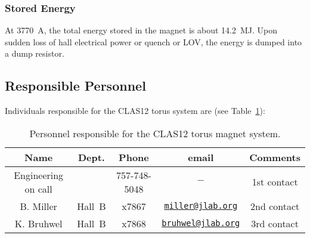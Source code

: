 \subsubsection{Stored Energy}

At 3770~A, the total energy stored in the magnet is about 14.2~MJ. Upon sudden loss of hall 
electrical power or quench or LOV, the energy is dumped into a dump resistor.

\subsection{Responsible Personnel}

Individuals responsible for the CLAS12 torus system are (see Table~\ref{tb:torus}):

\begin{table}[!htb]
\centering
\begin{tabular}{|c|c|c|c|c|} \hline
Name       & Dept.  & Phone&email&Comments \\ \hline
Engineering on call &  &757-748-5048&$-$& 1st contact \\ \hline
B. Miller  & Hall~B & x7867&\href{mailto:miller@jlab.org}{\nolinkurl{miller@jlab.org}}&2nd contact\\ \hline
K. Bruhwel & Hall~B & x7868&\href{mailto:}{\nolinkurl{bruhwel@jlab.org}}&3rd contact \\ \hline
\end{tabular}
\caption{Personnel responsible for the CLAS12 torus magnet system.} 
\label{tb:torus}
\end{table}


